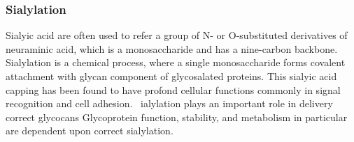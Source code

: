 \subsubsection {Sialylation}
Sialyic acid are often used to refer a group of N- or O-substituted derivatives of neuraminic acid, which is a monosaccharide and has a nine-carbon backbone.~\cite{Vocadlo_2009} Sialylation is a chemical process, where a single monosaccharide forms covalent attachment with glycan component of glycosalated proteins. This sialyic acid capping has been found to have profond cellular functions commonly in signal recognition and cell adhesion.~\cite{Bhide_2016} ialylation plays an important role in delivery correct glycocans Glycoprotein function, stability, and metabolism in particular are dependent upon correct sialylation.